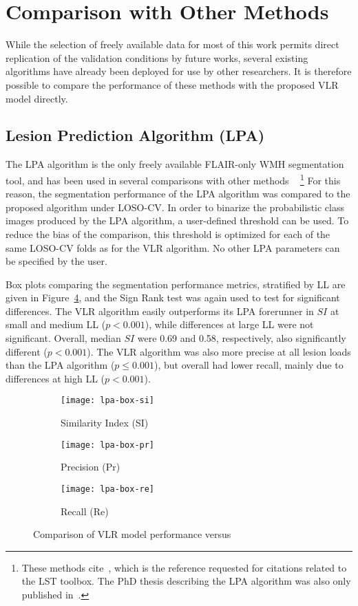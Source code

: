 \section{Comparison with Other Methods}
While the selection of freely available data for most of this work
permits direct replication of the validation conditions by future works,
several existing algorithms have already been deployed for use by other researchers.
It is therefore possible to compare the performance of these methods with
the proposed VLR model directly.
\subsection{Lesion Prediction Algorithm (LPA)}
The LPA algorithm is the only freely available FLAIR-only WMH segmentation tool,
and has been used in several comparisons with other methods%
~\cite{Griffanti2016,Brosch2016,Egger2017}%
\footnote{These methods cite~\cite{Schmidt2012},
  which is the reference requested for citations related to the LST toolbox.
  The PhD thesis describing the LPA algorithm was also only published in~\citeyear{Schmidt2017}.}
For this reason, the segmentation performance of the LPA algorithm
was compared to the proposed algorithm under LOSO-CV.
In order to binarize the probabilistic class images produced by the LPA algorithm,
a user-defined threshold can be used.
To reduce the bias of the comparison,
this threshold is optimized for each of the same LOSO-CV folds as for the VLR algorithm.
No other LPA parameters can be specified by the user.
\par
Box plots comparing the segmentation performance metrics, stratified by LL
are given in Figure~\ref{fig:seg-lpa}, and
the Sign Rank test was again used to test for significant differences.
The VLR algorithm easily outperforms its LPA forerunner
in $SI$ at small and medium LL ($p < 0.001$),
while differences at large LL were not significant.
Overall, median $SI$ were 0.69 and 0.58, respectively, also significantly different ($p < 0.001$).
The VLR algorithm was also more precise at all lesion loads than the LPA algorithm ($p \le 0.001$),
but overall had lower recall, mainly due to differences at high LL ($p < 0.001$).
\par
\begin{figure}
  \centering
  \begin{subfigure}{0.32\textwidth}
    \centering
    \texttt{[image: lpa-box-si]}
    \caption{Similarity Index (SI)}%
    \label{fig:seg-lpa-si}
  \end{subfigure}
  \begin{subfigure}{0.32\textwidth}
    \centering
    \texttt{[image: lpa-box-pr]}
    \caption{Precision (Pr)}%
    \label{fig:seg-lpa-pr}
  \end{subfigure}
  \begin{subfigure}{0.32\textwidth}
    \centering
    \texttt{[image: lpa-box-re]}
    \caption{Recall (Re)}%
    \label{fig:seg-lpa-re}
  \end{subfigure}
  \caption{Comparison of VLR model performance versus }%
  \label{fig:seg-lpa}
\end{figure}

